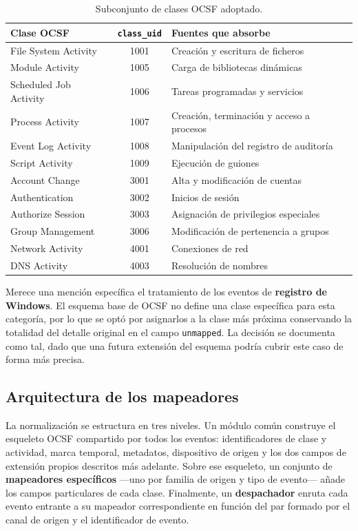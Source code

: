 \begin{table}[H]
\centering
\begin{tabular}{|l|c|l|}
\hline
\textbf{Clase OCSF} & \textbf{\texttt{class\_uid}} & \textbf{Fuentes que absorbe} \\
\hline
File System Activity & 1001 & Creación y escritura de ficheros \\
Module Activity & 1005 & Carga de bibliotecas dinámicas \\
Scheduled Job Activity & 1006 & Tareas programadas y servicios \\
Process Activity & 1007 & Creación, terminación y acceso a procesos \\
Event Log Activity & 1008 & Manipulación del registro de auditoría \\
Script Activity & 1009 & Ejecución de guiones \\
Account Change & 3001 & Alta y modificación de cuentas \\
Authentication & 3002 & Inicios de sesión \\
Authorize Session & 3003 & Asignación de privilegios especiales \\
Group Management & 3006 & Modificación de pertenencia a grupos \\
Network Activity & 4001 & Conexiones de red \\
DNS Activity & 4003 & Resolución de nombres \\
\hline
\end{tabular}
\caption{Subconjunto de clases OCSF adoptado.}
\label{tab:ocsf}
\end{table}

Merece una mención específica el tratamiento de los eventos de \textbf{registro de Windows}.
El esquema base de OCSF no define una clase específica para esta categoría, por lo que se
optó por asignarlos a la clase más próxima conservando la totalidad del detalle original en
el campo \texttt{unmapped}. La decisión se documenta como tal, dado que una futura extensión
del esquema podría cubrir este caso de forma más precisa.

\subsection{Arquitectura de los mapeadores}

La normalización se estructura en tres niveles. Un módulo común construye el esqueleto OCSF
compartido por todos los eventos: identificadores de clase y actividad, marca temporal,
metadatos, dispositivo de origen y los dos campos de extensión propios descritos más
adelante. Sobre ese esqueleto, un conjunto de \textbf{mapeadores específicos} —uno por
familia de origen y tipo de evento— añade los campos particulares de cada clase. Finalmente,
un \textbf{despachador} enruta cada evento entrante a su mapeador correspondiente en función
del par formado por el canal de origen y el identificador de evento.

